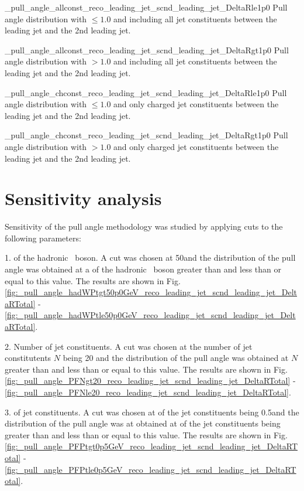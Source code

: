           {_pull_angle_allconst_reco_leading_jet_scnd_leading_jet_DeltaRle1p0}
          {Pull angle distribution with \DeltaR$\leq1.0$ and including all jet constituents between the leading jet and the 2nd leading jet.}

          {_pull_angle_allconst_reco_leading_jet_scnd_leading_jet_DeltaRgt1p0}
          {Pull angle distribution with \DeltaR$>1.0$ and including all jet constituents between the leading jet and the 2nd leading jet.}

          {_pull_angle_chconst_reco_leading_jet_scnd_leading_jet_DeltaRle1p0}
          {Pull angle distribution with \DeltaR$\leq1.0$ and only charged jet constituents between the leading jet and the 2nd leading jet.}

          {_pull_angle_chconst_reco_leading_jet_scnd_leading_jet_DeltaRgt1p0}
          {Pull angle distribution with \DeltaR$>1.0$ and only charged jet constituents between the leading jet and the 2nd leading jet.}


\section{Sensitivity analysis}

Sensitivity of the pull angle methodology was studied by applying cuts to the following parameters:

1. \pt of the hadronic \PW\ boson. A cut was chosen at 50\GeV and the distribution of the pull angle was obtained at a \pt of the hadronic \PW\ boson greater than and less than or equal to this value. The results are shown in Fig. \ref{fig:_pull_angle_hadWPtgt50p0GeV_reco_leading_jet_scnd_leading_jet_DeltaRTotal} - \ref{fig:_pull_angle_hadWPtle50p0GeV_reco_leading_jet_scnd_leading_jet_DeltaRTotal}.

2. Number of jet constituents. A cut was chosen at the number of jet constitutents $N$ being 20 and the distribution of the pull angle was obtained at $N$ greater than and less than or equal to this value. The results are shown in Fig. \ref{fig:_pull_angle_PFNgt20_reco_leading_jet_scnd_leading_jet_DeltaRTotal} - \ref{fig:_pull_angle_PFNle20_reco_leading_jet_scnd_leading_jet_DeltaRTotal}.
                                        
3. \pt of jet constituents. A cut was chosen at \pt of the jet constituents being 0.5\GeV and the distribution of the pull angle was at obtained at \pt of the jet constituents being greater than and less than or equal to this value. The results are shown in Fig. \ref{fig:_pull_angle_PFPtgt0p5GeV_reco_leading_jet_scnd_leading_jet_DeltaRTotal} - \ref{fig:_pull_angle_PFPtle0p5GeV_reco_leading_jet_scnd_leading_jet_DeltaRTotal}.

